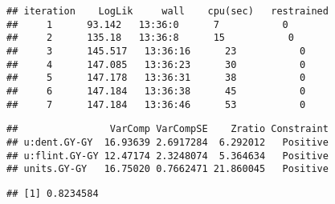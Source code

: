 \documentclass[]{article}
\newenvironment{Shaded}{\begin{snugshade}}{\end{snugshade}}
\newcommand{\KeywordTok}[1]{\textcolor[rgb]{0.13,0.29,0.53}{\textbf{#1}}}
\newcommand{\DataTypeTok}[1]{\textcolor[rgb]{0.13,0.29,0.53}{#1}}
\newcommand{\DecValTok}[1]{\textcolor[rgb]{0.00,0.00,0.81}{#1}}
\newcommand{\StringTok}[1]{\textcolor[rgb]{0.31,0.60,0.02}{#1}}
\newcommand{\OperatorTok}[1]{\textcolor[rgb]{0.81,0.36,0.00}{\textbf{#1}}}
\newcommand{\NormalTok}[1]{#1}
\begin{document}
\begin{verbatim}
## iteration    LogLik     wall    cpu(sec)   restrained
##     1      93.142   13:36:0      7           0
##     2      135.18   13:36:8      15           0
##     3      145.517   13:36:16      23           0
##     4      147.085   13:36:23      30           0
##     5      147.178   13:36:31      38           0
##     6      147.184   13:36:38      45           0
##     7      147.184   13:36:46      53           0
\end{verbatim}

\begin{Shaded}
\end{Shaded}

\begin{verbatim}
##                VarComp VarCompSE    Zratio Constraint
## u:dent.GY-GY  16.93639 2.6917284  6.292012   Positive
## u:flint.GY-GY 12.47174 2.3248074  5.364634   Positive
## units.GY-GY   16.75020 0.7662471 21.860045   Positive
\end{verbatim}

\begin{Shaded}
\end{Shaded}

\begin{verbatim}
## [1] 0.8234584
\end{verbatim}
\end{document}
